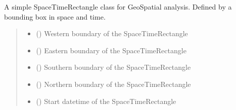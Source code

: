 \documentclass[letterpaper,10pt,english]{sphinxmanual}
\begin{document}
\begin{fulllineitems}
\begin{fulllineitems}
\begin{quote}
\begin{description}
\end{description}\end{quote}

\end{fulllineitems}


\end{fulllineitems}


\begin{fulllineitems}
\label{\detokenize{shape:GeoSpatialTools.shape.SpaceTimeRectangle}}
\pysigstartsignatures
\pysiglinewithargsret
{}
{\sphinxparamcomma {}\sphinxparamcomma {}\sphinxparamcomma {}\sphinxparamcomma {}\sphinxparamcomma {}}
{}
\pysigstopsignatures
\sphinxAtStartPar
A simple SpaceTimeRectangle class for GeoSpatial analysis. Defined by a
bounding box in space and time.
\begin{quote}\begin{description}
\begin{itemize}
\item {}
\sphinxAtStartPar
{} () \textendash{} Western boundary of the SpaceTimeRectangle

\item {}
\sphinxAtStartPar
{} () \textendash{} Eastern boundary of the SpaceTimeRectangle

\item {}
\sphinxAtStartPar
{} () \textendash{} Southern boundary of the SpaceTimeRectangle

\item {}
\sphinxAtStartPar
{} () \textendash{} Northern boundary of the SpaceTimeRectangle

\item {}
\sphinxAtStartPar
{} () \textendash{} Start datetime of the SpaceTimeRectangle


\end{itemize}
\end{description}
\end{quote}
\end{fulllineitems}
\end{document}
